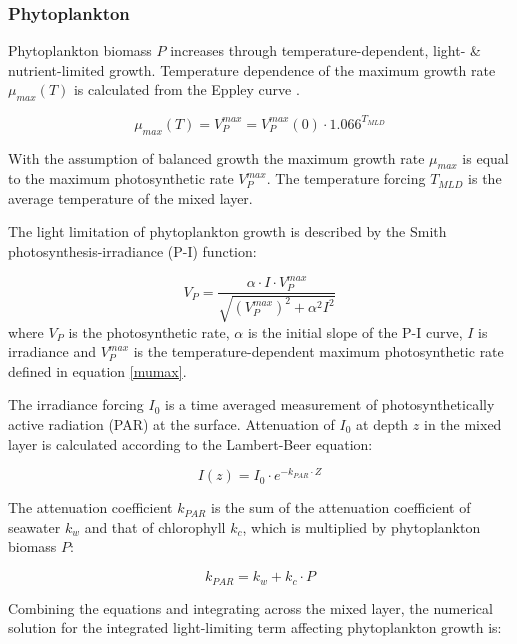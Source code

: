 \documentclass[template.tex]{subfiles}
\begin{document}
\subsubsection{Phytoplankton}
Phytoplankton biomass $P$ increases through temperature-dependent, light- \& nutrient-limited growth. Temperature dependence of the maximum growth rate $\mu_{max}(T)$ is calculated from the Eppley curve \citep{Eppley1972TemperatureSea}.

\begin{equation}
    \mu_{max}(T) = V^{max}_P = V^{max}_P(0) \cdot 1.066^{T_{MLD}} \label{mumax}
\end{equation}

With the assumption of balanced growth the maximum growth rate $\mu_{max}$ is equal to the maximum photosynthetic rate $V^{max}_P$. The temperature forcing $T_{MLD}$ is the average temperature of the mixed layer.

The light limitation of phytoplankton growth is described by the Smith photosynthesis-irradiance (P-I) function:

\begin{equation}
    V_P = \frac{\alpha \cdot I \cdot V^{max}_P}{\sqrt{(V^{max}_P)^2 + \alpha^2 I^2}}
\end{equation}
where $V_P$ is the photosynthetic rate, $\alpha$ is the initial slope of the P-I curve, $I$ is irradiance and $V^{max}_P$ is the temperature-dependent maximum photosynthetic rate defined in equation \eqref{mumax}.


The irradiance forcing $I_0$ is a time averaged measurement of photosynthetically active radiation (PAR) at the surface. Attenuation of $I_0$ at depth $z$ in the mixed layer is calculated according to the Lambert-Beer equation:

\begin{equation}
    I(z) = I_0 \cdot e^{-k_{PAR} \cdot Z} \label{beer}
\end{equation}

The attenuation coefficient $k_{PAR}$ is the sum of the attenuation coefficient of seawater $k_w$ and that of chlorophyll $k_c$, which is multiplied by phytoplankton biomass $P$:

\begin{equation}
    k_{PAR} = k_w + k_c \cdot P
\end{equation}

Combining the equations and integrating across the mixed layer, the numerical solution for the integrated light-limiting term affecting phytoplankton growth is:
\end{document}
